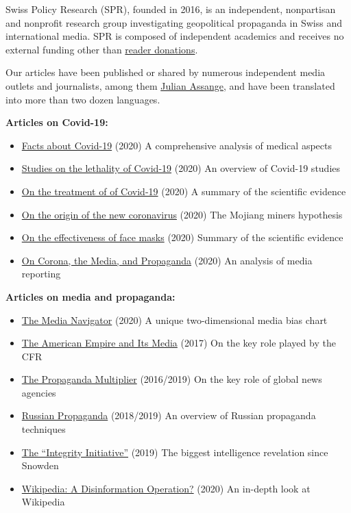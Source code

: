 Swiss Policy Research (SPR), founded in 2016, is an independent,
nonpartisan and nonprofit research group investigating geopolitical
propaganda in Swiss and international media. SPR is composed of
independent academics and receives no external funding other than
\href{https://swprs.org/donations/}{reader donations}.

Our articles have been published or shared by numerous independent media
outlets and journalists, among them
\href{https://swprs.files.wordpress.com/2018/01/assange-tweet.png}{Julian
Assange}, and have been translated into more than two dozen languages.

\textbf{Articles on Covid-19:}

\begin{itemize}
\tightlist
\item
  \href{https://swprs.org/a-swiss-doctor-on-covid-19/}{Facts about
  Covid-19} (2020) A comprehensive analysis of medical aspects
\item
  \href{https://swprs.org/studies-on-covid-19-lethality/}{Studies on the
  lethality of Covid-19} (2020) An overview of Covid-19 studies
\item
  \href{https://swprs.org/on-the-treatment-of-covid-19/}{On the
  treatment of of Covid-19} (2020) A summary of the scientific evidence
\item
  \href{https://swprs.org/covid-19-virus-origin-the-mojiang-miners-passage-hypothesis/}{On
  the origin of the new coronavirus} (2020) The Mojiang miners
  hypothesis
\item
  \href{https://swprs.org/face-masks-evidence/}{On the effectiveness of
  face masks} (2020) Summary of the scientific evidence
\item
  \href{https://swprs.org/corona-media-propaganda/}{On Corona, the
  Media, and Propaganda} (2020) An analysis of media reporting
\end{itemize}

\textbf{Articles on media and propaganda:}

\begin{itemize}
\tightlist
\item
  \href{https://swprs.org/media-navigator/}{The Media Navigator} (2020)
  A unique two-dimensional media bias chart
\item
  \href{https://swprs.org/the-american-empire-and-its-media/}{The
  American Empire and Its Media} (2017) On the key role played by the
  CFR
\item
  \href{https://swprs.org/the-propaganda-multiplier/}{The Propaganda
  Multiplier} (2016/2019) On the key role of global news agencies
\item
  \href{https://swprs.org/russian-propaganda/}{Russian Propaganda}
  (2018/2019) An overview of Russian propaganda techniques
\item
  \href{https://swprs.org/the-integrity-initiative/}{The ``Integrity
  Initiative''} (2019) The biggest intelligence revelation since Snowden
\item
  \href{https://swprs.org/wikipedia-disinformation-operation/}{Wikipedia:
  A Disinformation Operation?} (2020) An in-depth look at Wikipedia
\end{itemize}

